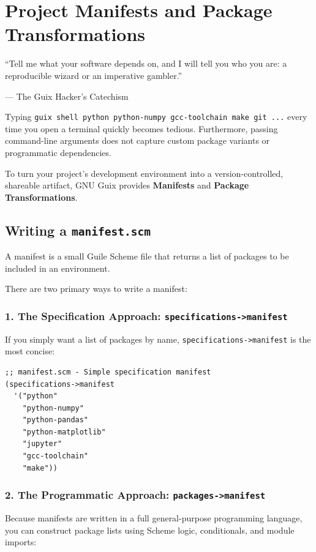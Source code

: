 \chapter{Project Manifests and Package Transformations}
\label{chap:manifests}

\epigraph{``Tell me what your software depends on, and I will tell you who you are: a reproducible wizard or an imperative gambler.''}{--- The Guix Hacker's Catechism}

\noindent
Typing \texttt{guix shell python python-numpy gcc-toolchain make git ...} every time you open a terminal quickly becomes tedious. Furthermore, passing command-line arguments does not capture custom package variants or programmatic dependencies.

To turn your project's development environment into a version-controlled, shareable artifact, GNU Guix provides \textbf{Manifests} and \textbf{Package Transformations}.

\section{Writing a \texttt{manifest.scm}}

A manifest is a small Guile Scheme file that returns a list of packages to be included in an environment.

There are two primary ways to write a manifest:

\subsection{1. The Specification Approach: \texttt{specifications->manifest}}

If you simply want a list of packages by name, \texttt{specifications->manifest} is the most concise:

\begin{lstlisting}[style=guixscheme]
;; manifest.scm - Simple specification manifest
(specifications->manifest
  '("python"
    "python-numpy"
    "python-pandas"
    "python-matplotlib"
    "jupyter"
    "gcc-toolchain"
    "make"))
\end{lstlisting}

\subsection{2. The Programmatic Approach: \texttt{packages->manifest}}

Because manifests are written in a full general-purpose programming language, you can construct package lists using Scheme logic, conditionals, and module imports:

